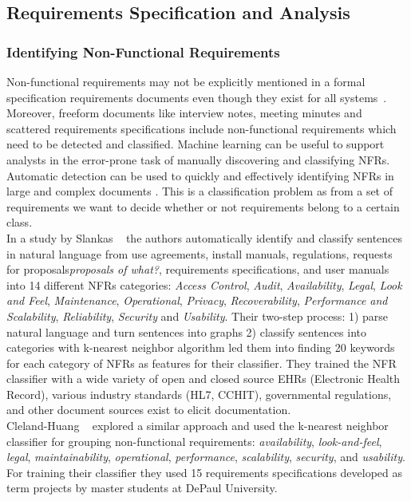 \subsection{Requirements Specification and Analysis}

\subsubsection{Identifying Non-Functional Requirements}

Non-functional requirements may not be explicitly mentioned in a formal
specification requirements documents even though they exist for all
systems~\cite{Slankas:2013}. Moreover, freeform documents like interview notes,
meeting minutes and scattered requirements specifications include non-functional
requirements which need to be detected and classified. Machine learning can be
useful to support analysts in the error-prone task of manually discovering and
classifying NFRs. Automatic detection can be used to quickly and effectively
identifying NFRs in large and complex documents \cite{Cleland-Huang2007}. This
is a classification problem as from a set of requirements we want to decide
whether or not requirements belong to a certain class. \\

In a study by Slankas \etal~\cite{Slankas:2013} the authors automatically
identify and classify sentences in natural language from use agreements, install
manuals, regulations, requests for proposals\emph{proposals of what?},
requirements specifications, and user manuals into 14 different NFRs categories:
\emph{Access Control}, \emph{Audit}, \emph{Availability}, \emph{Legal},
\emph{Look and Feel}, \emph{Maintenance}, \emph{Operational}, \emph{Privacy},
\emph{Recoverability}, \emph{Performance and Scalability}, \emph{Reliability},
\emph{Security} and \emph{Usability}.
Their two-step process: 1) parse natural language and turn sentences into graphs
2) classify sentences into categories with k-nearest neighbor algorithm led them
into finding 20 keywords for each category of NFRs as features for their
classifier. They trained the NFR classifier
with a wide variety of open and closed source EHRs (Electronic Health Record),
various industry standards (HL7, CCHIT), governmental regulations, and other
document sources exist to elicit documentation.\\

Cleland-Huang \etal~\cite{Cleland-Huang2007} explored a similar approach and
used the k-nearest neighbor classifier for grouping non-functional requirements:
\emph{availability}, \emph{look-and-feel}, \emph{legal}, \emph{maintainability},
\emph{operational}, \emph{performance}, \emph{scalability}, \emph{security}, and
\emph{usability}. For training their classifier they used 15 requirements
specifications developed as term projects by master students at DePaul University.

